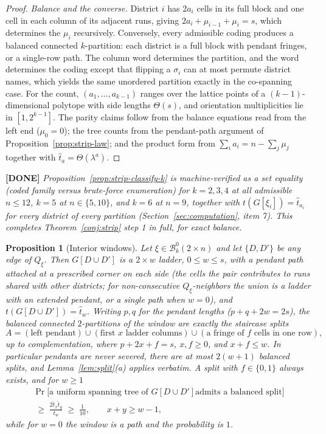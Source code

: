 \documentclass[11pt]{article}
\newcommand{\done}[1]{\medskip\noindent\textcolor{donecol}{\textbf{[DONE]} \emph{#1}}\medskip}
\newcommand{\Bcal}{\mathcal{B}}
\newtheorem{proposition}[theorem]{Proposition}
\begin{document}
\begin{proof}
\emph{Balance and the converse.} District $i$ has $2a_i$ cells in its
full block and one cell in each column of its adjacent runs, giving
$2a_i + \mu_{i-1} + \mu_i = s$, which determines the $\mu_i$
recursively. Conversely, every admissible coding produces a balanced
connected $k$-partition: each district is a full block with pendant
fringes, or a single-row path. The column word determines the partition,
and the word determines the coding except that flipping a $\sigma_i$ can
at most permute district names, which yields the same unordered
partition exactly in the co-spanning case. For the count,
$(a_1, \ldots, a_{k-1})$ ranges over the lattice points of a
$(k-1)$-dimensional polytope with side lengths $\Theta(s)$, and
orientation multiplicities lie in $[1, 2^{k-1}]$. The parity claims
follow from the balance equations read from the left end ($\mu_0 = 0$);
the tree counts from the pendant-path argument of
Proposition~\ref{prop:strip-law}; and the product form from
$\sum_i a_i = n - \sum_j \mu_j$ together with
$\hat t_a = \Theta(\lambda^{a})$.
\end{proof}

\done{Proposition~\ref{prop:strip-classify-k} is machine-verified as a
set equality (coded family versus brute-force enumeration) for
$k = 2, 3, 4$ at all admissible $n \le 12$, $k = 5$ at
$n \in \{5, 10\}$, and $k = 6$ at $n = 9$, together with
$t(G[\xi_i]) = \hat t_{a_i}$ for every district of every partition
(Section~\ref{sec:computation}, item 7). This completes
Theorem~\ref{conj:strip} step 1 in full, for exact balance.}

\begin{proposition}[Interior windows]
\label{prop:windows}
Let $\xi \in \Bcal_k^0(2 \times n)$ and let $\{D, D'\}$ be any edge of
$Q_\xi$. Then $G[D \cup D']$ is a $2 \times w$ ladder, $0 \le w \le s$,
with a pendant path attached at a prescribed corner on each side (the
cells the pair contributes to runs shared with other districts; for
non-consecutive $Q_\xi$-neighbors the union is a ladder with an extended
pendant, or a single path when $w = 0$), and
$t(G[D \cup D']) = \hat t_w$. Writing $p, q$ for the pendant lengths
($p + q + 2w = 2s$), the balanced connected $2$-partitions of the window
are exactly the staircase splits
\[
  A = (\text{left pendant}) \cup (\text{first } x \text{ ladder
  columns}) \cup (\text{a fringe of } f \text{ cells in one row}),
\]
up to complementation, where $p + 2x + f = s$, $x, f \ge 0$, and
$x + f \le w$. In particular pendants are never severed, there are at
most $2(w+1)$ balanced splits, and Lemma~\ref{lem:split}(a) applies
verbatim. A split with $f \in \{0, 1\}$ always exists, and for
$w \ge 1$
\[
\begin{gathered}
  \Pr\bigl[\text{a uniform spanning tree of } G[D \cup D'] \text{
  admits a balanced split}\bigr] \\
  \;\ge\; \frac{2 \hat t_x \hat t_y}{t_w} \;\ge\; \frac{1}{10},
  \qquad x + y \ge w - 1,
\end{gathered}
\]
while for $w = 0$ the window is a path and the probability is $1$.
\end{proposition}
\end{document}
